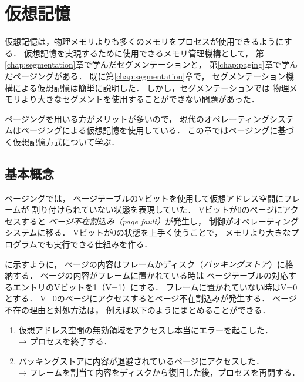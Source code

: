 \chapter{仮想記憶}
\label{virtualMemory}
仮想記憶は，物理メモリよりも多くのメモリをプロセスが使用できるようにする．
仮想記憶を実現するために使用できるメモリ管理機構として，
第\ref{chap:segmentation}章で学んだセグメンテーションと，
第\ref{chap:paging}章で学んだページングがある．
既に第\ref{chap:segmentation}章で，
セグメンテーション機構による仮想記憶は簡単に説明した．
しかし，セグメンテーションでは
物理メモリより大きなセグメントを使用することができない問題があった．

ページングを用いる方がメリットが多いので，
現代のオペレーティングシステムはページングによる仮想記憶を使用している．
この章ではページングに基づく仮想記憶方式について学ぶ．

\section{基本概念}
ページングでは，
ページテーブルのVビットを使用して仮想アドレス空間にフレームが
割り付けられていない状態を表現していた．
Vビットが0のページにアクセスすると
\emph{ページ不在割込み（page fault）}が発生し，
制御がオペレーティングシステムに移る．
Vビットが0の状態を上手く使うことで，
メモリより大きなプログラムでも実行できる仕組みを作る．

に示すように，
ページの内容はフレームかディスク（\emph{バッキングストア}）に格納する．
ページの内容がフレームに置かれている時は
ページテーブルの対応するエントリのVビットを1（V=1）にする．
フレームに置かれていない時はV=0とする．
V=0のページにアクセスするとページ不在割込みが発生する．
ページ不在の理由と対処方法は，
例えば以下のようにまとめることができる．

\begin{enumerate}
\item 仮想アドレス空間の無効領域をアクセスし本当にエラーを起こした．\\
  → プロセスを終了する．
\item バッキングストアに内容が退避されているページにアクセスした．\\
  → フレームを割当て内容をディスクから復旧した後，プロセスを再開する．
\end{enumerate}

